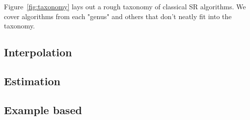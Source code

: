 
Figure~\ref{fig:taxonomy} lays out a rough taxonomy of classical SR algorithms. We cover algorithms from each "genus" and others that don't neatly fit into the taxonomy.
\subsection{Interpolation}
\subsection{Estimation}
\subsection{Example based}
